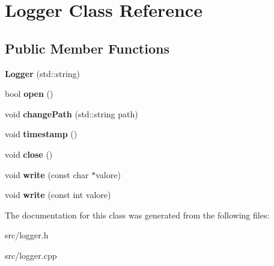 \hypertarget{class_logger}{
\section{Logger Class Reference}
\label{class_logger}
}
\subsection*{Public Member Functions}
\begin{DoxyCompactItemize}
\item 
\hypertarget{class_logger_a9e64dc7bb0d4e6c03b69884bea650895}{
{\bfseries Logger} (std::string)}
\label{class_logger_a9e64dc7bb0d4e6c03b69884bea650895}

\item 
\hypertarget{class_logger_aa91f40961099eb0b25ebef0d64ce7221}{
bool {\bfseries open} ()}
\label{class_logger_aa91f40961099eb0b25ebef0d64ce7221}

\item 
\hypertarget{class_logger_a41fa5242190c89592f5401684e74f550}{
void {\bfseries changePath} (std::string path)}
\label{class_logger_a41fa5242190c89592f5401684e74f550}

\item 
\hypertarget{class_logger_afaf7b3328a104410f34905e1572148df}{
void {\bfseries timestamp} ()}
\label{class_logger_afaf7b3328a104410f34905e1572148df}

\item 
\hypertarget{class_logger_afee2bab560c2db0190c980884d33868c}{
void {\bfseries close} ()}
\label{class_logger_afee2bab560c2db0190c980884d33868c}

\item 
\hypertarget{class_logger_a01f0ece1848872759aad96a6038de377}{
void {\bfseries write} (const char $\ast$valore)}
\label{class_logger_a01f0ece1848872759aad96a6038de377}

\item 
\hypertarget{class_logger_a7f0264da783b5c9b04f610c38d5c772f}{
void {\bfseries write} (const int valore)}
\label{class_logger_a7f0264da783b5c9b04f610c38d5c772f}

\end{DoxyCompactItemize}


The documentation for this class was generated from the following files:\begin{DoxyCompactItemize}
\item 
src/logger.h\item 
src/logger.cpp\end{DoxyCompactItemize}
